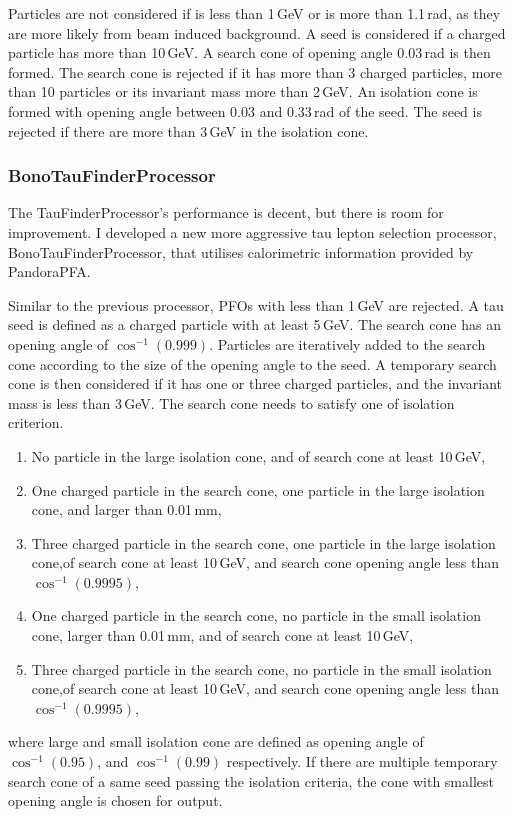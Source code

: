 Particles are not considered if \pT is less than 1\,GeV or \absCosTheta is more than 1.1\,rad, as they are more likely from beam induced background. A seed is considered if a charged particle has \pT more than 10\,GeV. A search cone of opening angle 0.03\,rad is then formed. The search cone is rejected if it has more than 3 charged particles, more than 10 particles or its invariant mass more than 2\,GeV. An isolation cone is formed with opening angle between 0.03 and 0.33\,rad of the seed. The seed is rejected if there are more than 3\,GeV in the isolation cone.

\subsubsection{BonoTauFinderProcessor}

The TauFinderProcessor's performance is decent, but there is room for improvement. I developed a new more aggressive tau lepton selection processor, BonoTauFinderProcessor, that utilises calorimetric information provided by PandoraPFA.

Similar to the previous processor, PFOs with \pT less than 1\,GeV are rejected. A tau seed is defined as a charged particle with \pT at least 5\,GeV. The search cone has an opening angle of $\cos^{-1}(0.999)$. Particles are iteratively added to the search cone according to the size of the opening angle to the seed. A temporary search cone is then considered if it has one or three charged particles, and the invariant mass is less than 3\,GeV. The search cone needs to satisfy one of isolation criterion.
\begin{enumerate}
\item No particle in the large isolation cone, and \pT of search cone at least 10\,GeV,
\item One charged particle in the search cone, one particle in the large isolation cone, and \rZero larger than 0.01\,mm,
\item Three charged particle in the search cone, one particle in the large isolation cone,\pT of search cone at least 10\,GeV, and search cone opening angle less than $\cos^{-1}(0.9995)$,
\item One charged particle in the search cone, no particle in the small isolation cone, \rZero larger than 0.01\,mm, and \pT of search cone at least 10\,GeV,
\item Three charged particle in the search cone, no particle in the small isolation cone,\pT of search cone at least 10\,GeV, and search cone opening angle less than $\cos^{-1}(0.9995)$,
\end{enumerate}
where large and small isolation cone are defined as opening angle of $\cos^{-1}(0.95)$, and $\cos^{-1}(0.99)$ respectively.
If there are multiple temporary search cone of a same seed passing the isolation criteria, the cone with smallest opening angle is chosen for output.


